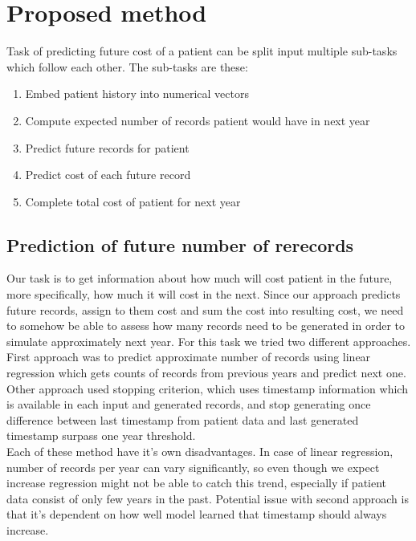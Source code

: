
\chapter{Proposed method}

Task of predicting future cost of a patient can be split input multiple sub-tasks which follow each other. The sub-tasks are these:

\begin{enumerate}
	\item Embed patient history into numerical vectors
	\item Compute expected number of records patient would have in next year
	\item Predict future records for patient
	\item Predict cost of each future record
	\item Complete total cost of patient for next year
\end{enumerate}




\section{Prediction of future number of rerecords}

Our task is to get information about how much will cost patient in the future, more specifically, how much it will cost in the next. Since our approach predicts future records, assign to them cost and sum the cost into resulting cost, we need to somehow be able to assess how many records need to be generated in order to simulate approximately next year. For this task we tried two different approaches.
\\

First approach was to predict approximate number of records using linear regression which gets counts of records from previous years and predict next one. Other approach used stopping criterion, which uses timestamp information which is available in each input and generated records, and stop generating once difference between last timestamp from patient data and last generated timestamp surpass one year threshold.
\\

Each of these method have it's own disadvantages. In case of linear regression, number of records per year can vary significantly, so even though we expect increase \cite{num_of_vis} regression might not be able to catch this trend, especially if patient data consist of only few years in the past. Potential issue with second approach is that it's dependent on how well model learned that timestamp should always increase.  



